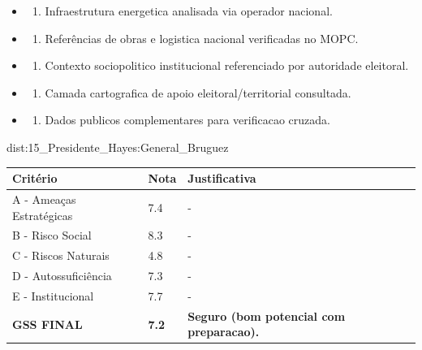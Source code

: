 {\begin{itemize}
\item
  \begin{enumerate}
  \def\labelenumi{\arabic{enumi})}
  \setcounter{enumi}{7}
  \tightlist
  \item
    Infraestrutura energetica analisada via operador nacional.
  \end{enumerate}
\item
  \begin{enumerate}
  \def\labelenumi{\arabic{enumi})}
  \setcounter{enumi}{8}
  \tightlist
  \item
    Referências de obras e logistica nacional verificadas no MOPC.
  \end{enumerate}
\item
  \begin{enumerate}
  \def\labelenumi{\arabic{enumi})}
  \setcounter{enumi}{9}
  \tightlist
  \item
    Contexto sociopolitico institucional referenciado por autoridade
    eleitoral.
  \end{enumerate}
\item
  \begin{enumerate}
  \def\labelenumi{\arabic{enumi})}
  \setcounter{enumi}{10}
  \tightlist
  \item
    Camada cartografica de apoio eleitoral/\allowbreak territorial consultada.
  \end{enumerate}
\item
  \begin{enumerate}
  \def\labelenumi{\arabic{enumi})}
  \setcounter{enumi}{11}
  \tightlist
  \item
    Dados publicos complementares para verificacao cruzada.
  \end{enumerate}
\end{itemize}}{dist:15_Presidente_Hayes:General_Bruguez}
\begin{table}[ht!]
\small \begin{tabular}{p{3.0cm}p{0.8cm}p{6.0cm}} \toprule
\textbf{Critério} & \textbf{Nota} & \textbf{Justificativa} \\ \midrule
A - Ameaças Estratégicas & 7.4 & - \\
B - Risco Social & 8.3 & - \\
C - Riscos Naturais & 4.8 & - \\
D - Autossuficiência & 7.3 & - \\
E - Institucional & 7.7 & - \\
\midrule \textbf{GSS FINAL} & \textbf{7.2} & \textbf{Seguro (bom potencial com preparacao).} \\ \bottomrule \end{tabular}
\end{table}
